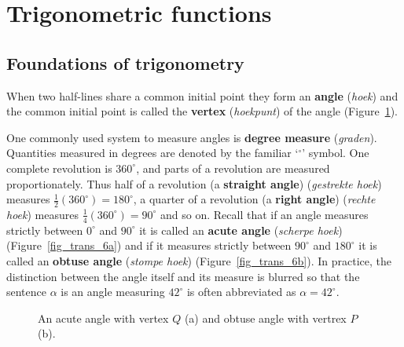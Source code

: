 \fi




\section{Trigonometric functions}


\label{sec_trigo}
\subsection{Foundations of trigonometry}
When two half-lines share a common initial point they form an \textbf{angle} (\textit{hoek}) and the common initial point is called the \textbf{vertex} (\textit{hoekpunt}) of the angle (Figure~\ref{fig_trans_6}).



One commonly used system to measure angles is \textbf{degree measure} (\textit{graden}).  Quantities measured in degrees are denoted by the familiar `$^{\circ}$' symbol.  One complete revolution is $360^{\circ}$, and parts of a revolution are measured proportionately.  Thus half of a revolution (a \textbf{straight angle}) (\textit{gestrekte hoek}) measures $\frac{1}{2} \left(360^{\circ}\right) = 180^{\circ}$, a quarter of a revolution (a \textbf{right angle}) (\textit{rechte hoek}) measures $\frac{1}{4} \left(360^{\circ}\right) = 90^{\circ}$ and so on. Recall that if an angle measures strictly between $0^{\circ}$ and $90^{\circ}$ it is called an \textbf{acute angle} (\textit{scherpe hoek}) (Figure~\ref{fig_trans_6a}) and if it measures strictly between $90^{\circ}$ and $180^{\circ}$ it is called an \textbf{obtuse angle} (\textit{stompe hoek}) (Figure~\ref{fig_trans_6b}). In practice, the distinction between the angle itself and its measure is blurred so that the sentence $\alpha$ is an angle measuring $42^{\circ}$ is often abbreviated as $\alpha = 42^{\circ}$.

\begin{figure}[h]
\centering
\centerline{
\hspace{1cm}
}
\caption{An acute angle with vertex $Q$ (a) and obtuse angle with vertrex $P$ (b). }
\label{fig_trans_6}
\end{figure}


